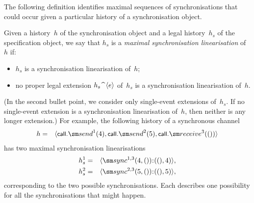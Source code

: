


The following definition identifies maximal sequences of synchronisations
that could occur given a particular history of a synchronisation object.
%
\begin{definition}
Given a history~$h$ of the synchronisation object and a legal history~$h_s$ of
the specification object, we say that $h_s$ is a \emph{maximal synchronisation
  linearisation} of~$h$ if:
\begin{itemize}
\item $h_s$ is a synchronisation linearisation of~$h$;

\item no proper legal extension $h_s \mathbin{\widehat{\ }} \langle e \rangle$ of~$h_s$ is a
  synchronisation linearisation of~$h$.
\end{itemize}
\end{definition}
%
(In the second bullet point, we consider only single-event extensions
of~$h_s$.  If no single-event extension is a synchronisation linearisation
of~$h$, then neither is any longer extension.)
%
For example, the following history of a synchronous channel
\begin{eqnarray*}
h & = &\seq{\call.\send^1(4), \call.\send^2(5), \call.\receive^3(())}
\end{eqnarray*}
has two maximal synchronisation linearisations
\begin{eqnarray*}
h_s^1 & = &  \seq{\sync^{1,3}(4,())\::((),4)}, \\
h_s^2 & = & \seq{\sync^{2,3}(5,())\::((),5)},
\end{eqnarray*}
corresponding to the two possible synchronisations.  Each describes one
possibility for all the synchronisations that might happen. 

